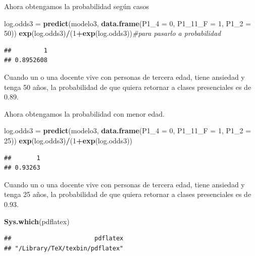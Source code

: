 \documentclass[
]{article}
\newenvironment{Shaded}{\begin{snugshade}}{\end{snugshade}}
\newcommand{\AttributeTok}[1]{\textcolor[rgb]{0.13,0.29,0.53}{#1}}
\newcommand{\CommentTok}[1]{\textcolor[rgb]{0.56,0.35,0.01}{\textit{#1}}}
\newcommand{\DecValTok}[1]{\textcolor[rgb]{0.00,0.00,0.81}{#1}}
\newcommand{\FunctionTok}[1]{\textcolor[rgb]{0.13,0.29,0.53}{\textbf{#1}}}
\newcommand{\NormalTok}[1]{#1}
\newcommand{\OtherTok}[1]{\textcolor[rgb]{0.56,0.35,0.01}{#1}}
\newcommand{\SpecialCharTok}[1]{\textcolor[rgb]{0.81,0.36,0.00}{\textbf{#1}}}
\newcommand{\StringTok}[1]{\textcolor[rgb]{0.31,0.60,0.02}{#1}}
\begin{document}
Ahora obtengamos la probabilidad según casos

\begin{Shaded}
\begin{Highlighting}[]
\NormalTok{log.odds3 }\OtherTok{=} \FunctionTok{predict}\NormalTok{(modelo3, }\FunctionTok{data.frame}\NormalTok{(}\AttributeTok{P1\_4 =} \DecValTok{0}\NormalTok{, }\AttributeTok{P1\_11\_F =} \DecValTok{1}\NormalTok{, }\AttributeTok{P1\_2 =} \DecValTok{50}\NormalTok{))}
\FunctionTok{exp}\NormalTok{(log.odds3)}\SpecialCharTok{/}\NormalTok{(}\DecValTok{1}\SpecialCharTok{+}\FunctionTok{exp}\NormalTok{(log.odds3))}\CommentTok{\#para pasarlo a probabilidad}
\end{Highlighting}
\end{Shaded}

\begin{verbatim}
##         1 
## 0.8952608
\end{verbatim}

Cuando un o una docente vive con personas de tercera edad, tiene
ansiedad y tenga 50 años, la probabilidad de que quiera retornar a
clases presenciales es de 0.89.

Ahora obtengamos la probabilidad con menor edad.

\begin{Shaded}
\begin{Highlighting}[]
\NormalTok{log.odds3 }\OtherTok{=} \FunctionTok{predict}\NormalTok{(modelo3, }\FunctionTok{data.frame}\NormalTok{(}\AttributeTok{P1\_4 =} \DecValTok{0}\NormalTok{, }\AttributeTok{P1\_11\_F =} \DecValTok{1}\NormalTok{, }\AttributeTok{P1\_2 =} \DecValTok{25}\NormalTok{))}
\FunctionTok{exp}\NormalTok{(log.odds3)}\SpecialCharTok{/}\NormalTok{(}\DecValTok{1}\SpecialCharTok{+}\FunctionTok{exp}\NormalTok{(log.odds3))}
\end{Highlighting}
\end{Shaded}

\begin{verbatim}
##       1 
## 0.93263
\end{verbatim}

Cuando un o una docente vive con personas de tercera edad, tiene
ansiedad y tenga 25 años, la probabilidad de que quiera retornar a
clases presenciales es de 0.93.

\begin{Shaded}
\begin{Highlighting}[]
\FunctionTok{Sys.which}\NormalTok{(}\StringTok{\textquotesingle{}pdflatex\textquotesingle{}}\NormalTok{)}
\end{Highlighting}
\end{Shaded}

\begin{verbatim}
##                       pdflatex 
## "/Library/TeX/texbin/pdflatex"
\end{verbatim}
\end{document}
